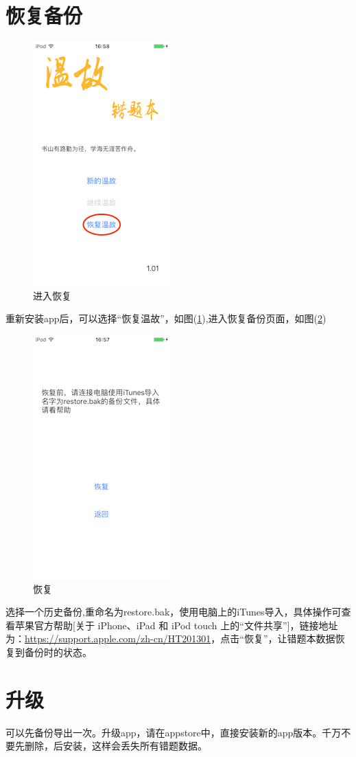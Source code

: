 \section{恢复备份}
\label{restore}
\begin{figure}[H]
	\centering
	\includegraphics{img/2.png}
	\caption{进入恢复}
	\label{img2}
\end{figure}

重新安装app后，可以选择“恢复温故”，如图(\ref{img2}),进入恢复备份页面，如图(\ref{img3})

\begin{figure}[H]
	\centering
	\includegraphics{img/3.png}
	\caption{恢复}
	\label{img3}
\end{figure}

选择一个历史备份,重命名为restore.bak，使用电脑上的iTunes导入，具体操作可查看苹果官方帮助[关于 iPhone、iPad 和 iPod touch 上的“文件共享”]，链接地址为：\url{https://support.apple.com/zh-cn/HT201301}，点击“恢复”，让错题本数据恢复到备份时的状态。
\section{升级}
可以先备份导出一次。升级app，请在appstore中，直接安装新的app版本。千万不要先删除，后安装，这样会丢失所有错题数据。